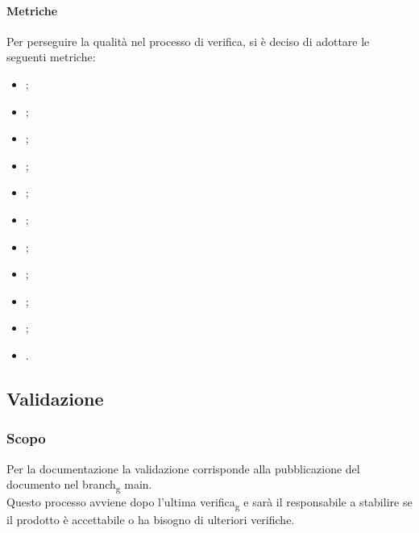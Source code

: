 \paragraph{Metriche}
Per perseguire la qualità nel processo di verifica, si è deciso di
adottare le seguenti metriche:
\begin{itemize}
      \item {};
      \item {};
      \item {};
      \item {};
      \item {};
      \item {};
      \item {};
      \item {};
      \item {};
      \item {};
      \item {}.
\end{itemize}
\subsection{Validazione}
\subsubsection{Scopo}
Per la documentazione la validazione corrisponde alla pubblicazione del
documento nel branch\textsubscript{g} main.\\ Questo processo avviene dopo
l'ultima verifica\textsubscript{g} e sarà il responsabile a stabilire se il
prodotto è accettabile o ha bisogno di ulteriori verifiche.
